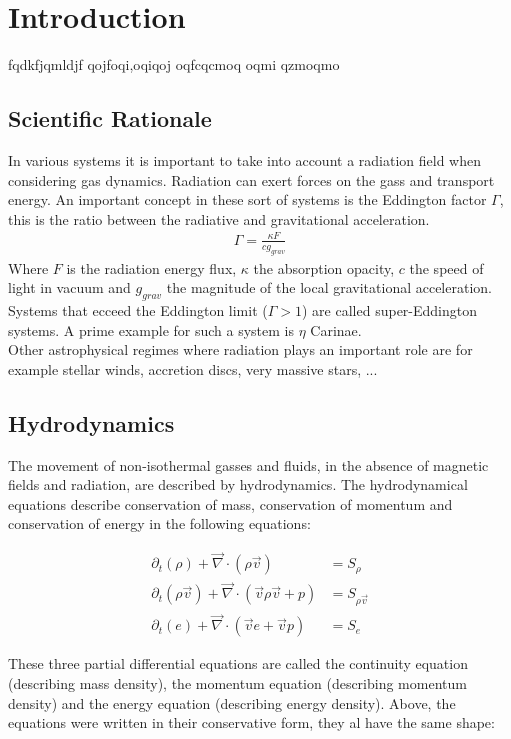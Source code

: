 \section{Introduction}
fqdkfjqmldjf qojfoqi,oqiqoj oqfcqcmoq oqmi qzmoqmo

\subsection{Scientific Rationale}
In various systems it is important to take into account a radiation field when considering gas dynamics. Radiation can exert forces on the gass and transport energy. An important concept in these sort of systems is the Eddington factor $\Gamma$, this is the ratio between the radiative and gravitational acceleration.
\begin{align}
	\Gamma = \frac{\kappa F}{c g_{grav}}
\end{align}
Where $F$ is the radiation energy flux, $\kappa$ the absorption opacity, $c$ the speed of light in vacuum and $g_{grav}$ the magnitude of the local gravitational acceleration. Systems that ecceed the Eddington limit ($\Gamma > 1$) are called super-Eddington systems. A prime example for such a system is $\eta$ Carinae.\\

Other astrophysical regimes where radiation plays an important role are for example stellar winds, accretion discs, very massive stars, ...

\subsection{Hydrodynamics}
The movement of non-isothermal gasses and fluids, in the absence of magnetic fields and radiation, are described by hydrodynamics. The hydrodynamical equations describe conservation of mass, conservation of momentum and conservation of energy in the following equations:

\begin{align}
 \partial_t \left(\rho \right) + \vec{\nabla} \cdot \left( \rho \vec{v}  \right) &= S_\rho \\
 \partial_t \left(\rho \vec{v} \right) + \vec{\nabla} \cdot \left( \vec{v} \rho \vec{v} + p \right)    &= S_{\rho \vec{v}} \\
 \partial_t \left(e \right) + \vec{\nabla} \cdot \left( \vec{v} e + \vec{v} p \right) &= S_e
\end{align}

These three partial differential equations are called the continuity equation (describing mass density), the momentum equation (describing momentum density) and the energy equation (describing energy density). Above, the equations were written in their conservative form, they al have the same shape:

